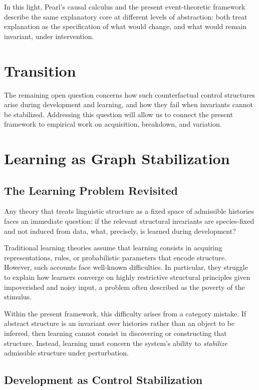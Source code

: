 \documentclass[11pt]{article}
\begin{document}
In this light, Pearl’s causal calculus and the present event-theoretic framework describe the same explanatory core at different levels of abstraction: both treat explanation as the specification of what would change, and what would remain invariant, under intervention.

\section{Transition}

The remaining open question concerns how such counterfactual control structures arise during development and learning, and how they fail when invariants cannot be stabilized. Addressing this question will allow us to connect the present framework to empirical work on acquisition, breakdown, and variation.

\section{Learning as Graph Stabilization}
\label{sec:learning}

\subsection{The Learning Problem Revisited}

Any theory that treats linguistic structure as a fixed space of admissible histories faces an immediate question: if the relevant structural invariants are species-fixed and not induced from data, what, precisely, is learned during development?

Traditional learning theories assume that learning consists in acquiring representations, rules, or probabilistic parameters that encode structure. However, such accounts face well-known difficulties. In particular, they struggle to explain how learners converge on highly restrictive structural principles given impoverished and noisy input, a problem often described as the poverty of the stimulus.

Within the present framework, this difficulty arises from a category mistake. If abstract structure is an invariant over histories rather than an object to be inferred, then learning cannot consist in discovering or constructing that structure. Instead, learning must concern the system’s ability to \emph{stabilize} admissible structure under perturbation.

\subsection{Development as Control Stabilization}
\end{document}
